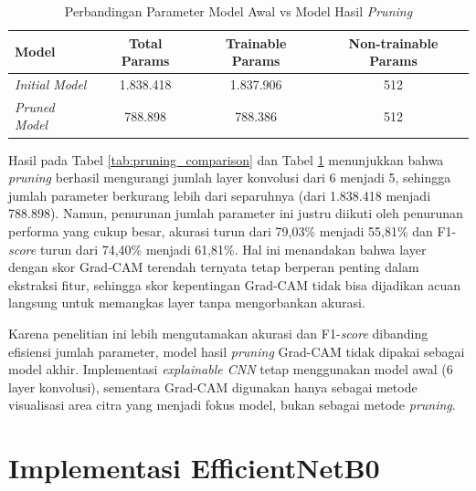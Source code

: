 \begin{table}[htbp]
	\centering
	\caption{Perbandingan Parameter Model Awal vs Model Hasil \textit{Pruning}}
	\label{tab:pruning_params}
	\begin{tabular}{|l|c|c|c|}
		\hline
		\textbf{Model} & \textbf{Total Params} & \textbf{Trainable Params} & \textbf{Non-trainable Params} \\ \hline
		\textit{Initial Model} & 1.838.418 & 1.837.906 & 512 \\ \hline
		\textit{Pruned Model} & 788.898 & 788.386 & 512 \\ \hline
	\end{tabular}
\end{table}

Hasil pada Tabel \ref{tab:pruning_comparison} dan Tabel \ref{tab:pruning_params} menunjukkan bahwa \textit{pruning} berhasil mengurangi jumlah layer konvolusi dari 6 menjadi 5, sehingga jumlah parameter berkurang lebih dari separuhnya (dari 1.838.418 menjadi 788.898). Namun, penurunan jumlah parameter ini justru diikuti oleh penurunan performa yang cukup besar, akurasi turun dari 79,03\% menjadi 55,81\% dan F1-\textit{score} turun dari 74,40\% menjadi 61,81\%. Hal ini menandakan bahwa layer dengan skor Grad-CAM terendah ternyata tetap berperan penting dalam ekstraksi fitur, sehingga skor kepentingan Grad-CAM tidak bisa dijadikan acuan langsung untuk memangkas layer tanpa mengorbankan akurasi.

Karena penelitian ini lebih mengutamakan akurasi dan F1-\textit{score} dibanding efisiensi jumlah parameter, model hasil \textit{pruning} Grad-CAM tidak dipakai sebagai model akhir. Implementasi \textit{explainable CNN} tetap menggunakan model awal (6 layer konvolusi), sementara Grad-CAM digunakan hanya sebagai metode visualisasi area citra yang menjadi fokus model, bukan sebagai metode \textit{pruning}.

\section{Implementasi EfficientNetB0}

